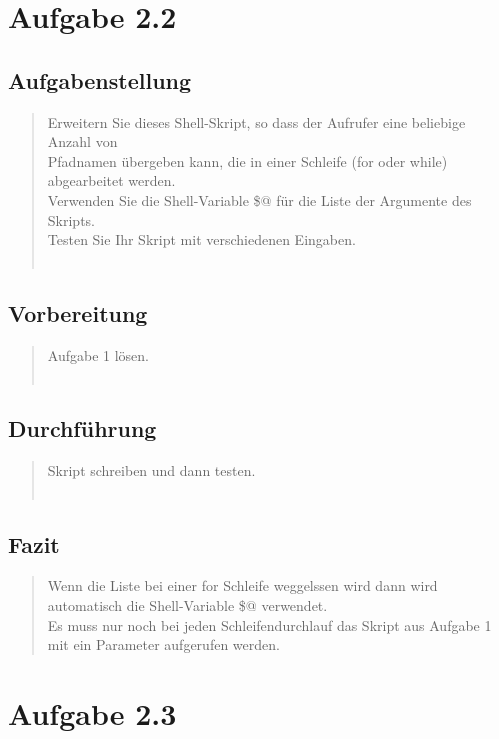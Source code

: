 \section{Aufgabe 2.2}
	\subsection{Aufgabenstellung}
		\begin{quote}
			Erweitern Sie dieses Shell-Skript, so dass der Aufrufer eine beliebige Anzahl von\\
			Pfadnamen \"ubergeben kann, die in einer Schleife (for oder while) abgearbeitet werden.\\
			Verwenden Sie die Shell-Variable \$@ f\"ur die Liste der Argumente des Skripts.\\
			Testen Sie Ihr Skript mit verschiedenen Eingaben.\\ \\
		\end{quote}
	\subsection{Vorbereitung}
		\begin{quote}
			Aufgabe 1 l\"osen.\\ \\
		\end{quote}
	\subsection{Durchführung}
		\begin{quote}
			Skript schreiben und dann testen.\\ \\
		\end{quote}
	\subsection{Fazit}
		\begin{quote}
			Wenn die Liste bei einer for Schleife weggelssen wird dann wird automatisch die Shell-Variable \$@ verwendet.\\
			Es muss nur noch bei jeden Schleifendurchlauf das Skript aus Aufgabe 1 mit ein Parameter aufgerufen werden.\\
		\end{quote}
\newpage
\section{Aufgabe 2.3}
